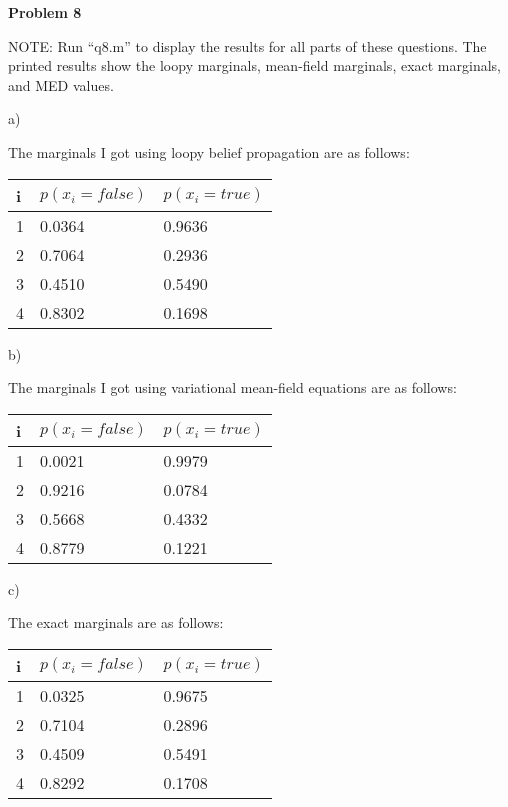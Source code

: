 \textbf{Problem 8}

NOTE: Run ``q8.m'' to display the results for all parts of these questions. The printed results show the loopy marginals, mean-field marginals, exact marginals, and MED values.

a)

The marginals I got using loopy belief propagation are as follows:

\begin{table}[h]
	\begin{tabular}{|l|l|l|}
		\hline
		i & $p(x_i = false)$ & $p(x_i = true)$ \\ \hline 
		1 & 0.0364 & 0.9636 \\ \hline
		2 & 0.7064 & 0.2936 \\ \hline
		3 & 0.4510 & 0.5490 \\ \hline
		4 & 0.8302 & 0.1698 \\ \hline
	\end{tabular}
\end{table}

b)

The marginals I got using variational mean-field equations are as follows:

\begin{table}[h]
	\begin{tabular}{|l|l|l|}
		\hline
		i & $p(x_i = false)$ & $p(x_i = true)$ \\ \hline 
		1 & 0.0021 & 0.9979 \\ \hline
		2 & 0.9216 & 0.0784 \\ \hline
		3 & 0.5668 & 0.4332 \\ \hline
		4 & 0.8779 & 0.1221 \\ \hline
	\end{tabular}
\end{table}

c)

The exact marginals are as follows:

\begin{table}[h]
	\begin{tabular}{|l|l|l|}
		\hline
		i & $p(x_i = false)$ & $p(x_i = true)$ \\ \hline 
		1 & 0.0325 & 0.9675 \\ \hline
		2 & 0.7104 & 0.2896 \\ \hline
		3 & 0.4509 & 0.5491 \\ \hline
		4 & 0.8292 & 0.1708 \\ \hline
	\end{tabular}
\end{table}

